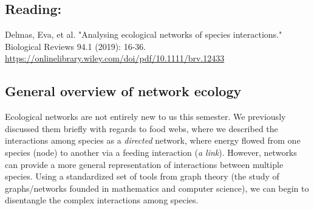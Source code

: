 \documentclass[12pt]{article}
\begin{document}
\subsection*{Reading:}

Delmas, Eva, et al. "Analysing ecological networks of species interactions." Biological Reviews 94.1 (2019): 16-36. \\
\url{https://onlinelibrary.wiley.com/doi/pdf/10.1111/brv.12433}














\begin{center}
\noindent\hrulefill 
\end{center}



\clearpage
\subsection*{General overview of network ecology}

Ecological networks are not entirely new to us this semester. We previously discussed them briefly with regards to food webs, where we described the interactions among species as a \textit{directed} network, where energy flowed from one species (node) to another via a feeding interaction (\textit{a link}). However, networks can provide a more general representation of interactions between multiple species. Using a standardized set of tools from graph theory (the study of graphs/networks founded in mathematics and computer science), we can begin to disentangle the complex interactions among species.










\bigskip
\end{document}
